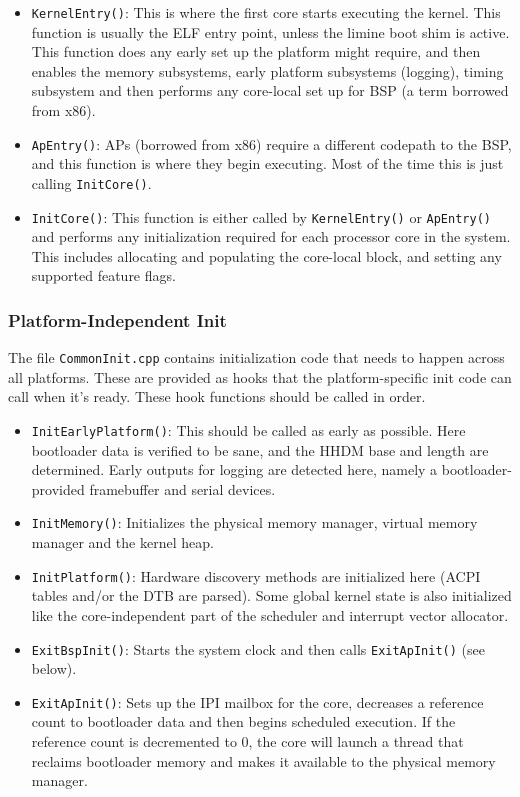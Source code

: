 \begin{itemize}
    \item \verb|KernelEntry()|: This is where the first core starts executing the kernel. This function is usually the ELF entry point, unless the limine boot shim is active. This function does any early set up the platform might require, and then enables the memory subsystems, early platform subsystems (logging), timing subsystem and then performs any core-local set up for BSP (a term borrowed from x86). 
    \item \verb|ApEntry()|: APs (borrowed from x86) require a different codepath to the BSP, and this function is where they begin executing. Most of the time this is just calling \verb|InitCore()|.
    \item \verb|InitCore()|: This function is either called by \verb|KernelEntry()| or \verb|ApEntry()| and performs any initialization required for each processor core in the system. This includes allocating and populating the core-local block, and setting any supported feature flags.
\end{itemize}

\subsubsection{Platform-Independent Init}
The file \verb|CommonInit.cpp| contains initialization code that needs to happen across all platforms. These are provided as hooks that the platform-specific init code can call when it's ready. These hook functions should be called in order.

\begin{itemize}
    \item \verb|InitEarlyPlatform()|: This should be called as early as possible. Here bootloader data is verified to be sane, and the HHDM base and length are determined. Early outputs for logging are detected here, namely a bootloader-provided framebuffer and serial devices.
    \item \verb|InitMemory()|: Initializes the physical memory manager, virtual memory manager and the kernel heap.
    \item \verb|InitPlatform()|: Hardware discovery methods are initialized here (ACPI tables and/or the DTB are parsed). Some global kernel state is also initialized like the core-independent part of the scheduler and interrupt vector allocator.
    \item \verb|ExitBspInit()|: Starts the system clock and then calls \verb|ExitApInit()| (see below).
    \item \verb|ExitApInit()|: Sets up the IPI mailbox for the core, decreases a reference count to bootloader data and then begins scheduled execution. If the reference count is decremented to 0, the core will launch a thread that reclaims bootloader memory and makes it available to the physical memory manager.
\end{itemize}

